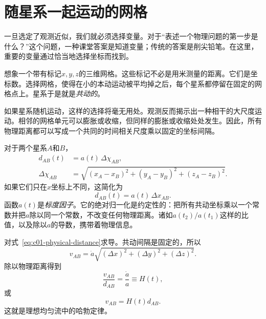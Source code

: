 \begin{classroomqa}
\end{classroomqa}

\section{随星系一起运动的网格}

一旦选定了观测近似，我们就必须选择变量。对于“表述一个物理问题的第一步是什么？”这个问题，一种课堂答案是知道变量；传统的答案是削尖铅笔。在这里，重要的变量通过恰当地选择坐标而找到。

想象一个带有标记\(x,y,z\)的三维网格。这些标记不必是用米测量的距离。它们是坐标数。选择网格，使得在小的本动运动被平均掉之后，每个星系都停留在固定的网格点上。星系于是就是\emph{共动的}。

如果星系随机运动，这样的选择将毫无用处。观测反而揭示出一种相干的大尺度运动。相邻的网格单元可以膨胀或收缩，但同样的膨胀或收缩处处发生。因此，所有物理距离都可以写成一个共同的时间相关尺度乘以固定的坐标间隔。

对于两个星系\(A\)和\(B\)，
\begin{equation}
\begin{aligned}
d_{AB}(t)&=a(t)\,\Delta\chi_{AB},\\
\Delta\chi_{AB}
&=\sqrt{(x_A-x_B)^2+(y_A-y_B)^2+(z_A-z_B)^2}.
\end{aligned}
\label{eq:c01-physical-distance}
\end{equation}
如果它们只在\(x\)坐标上不同，这简化为
\begin{equation}
d_{AB}(t)=a(t)\,\Delta x_{AB}.
\end{equation}
函数\(a(t)\)是\emph{标度因子}。它的绝对归一化是约定性的：把所有共动坐标乘以一个常数并把\(a\)除以同一个常数，不改变任何物理距离。诸如\(a(t_2)/a(t_1)\)这样的比值，以及除以\(a\)的导数，携带着物理信息。

对式~\eqref{eq:c01-physical-distance}求导。共动间隔是固定的，所以
\begin{equation}
v_{AB}=\dot a\sqrt{(\Delta x)^2+(\Delta y)^2+(\Delta z)^2}.
\end{equation}
除以物理距离得到
\begin{equation}
\frac{v_{AB}}{d_{AB}}=\frac{\dot a}{a}\equiv H(t),
\label{eq:c01-hubble-parameter}
\end{equation}
或
\begin{equation}
\boxed{v_{AB}=H(t)d_{AB}.}
\label{eq:c01-hubble-law}
\end{equation}
这就是理想均匀流中的哈勃定律。


